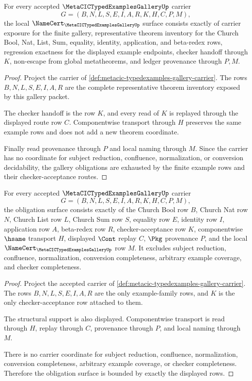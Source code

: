 \begin{theorem}
\label{thm:metacic-typedexamples-gallery-namecert-obligations}
For every accepted $\MetaCICTypedExamplesGalleryUp$ carrier
$$
G=(B,N,L,S,E,I,A,R,K,H,C,P,M),
$$
the local $\NameCert_{\MetaCICTypedExamplesGalleryUp}$ surface consists exactly of carrier exposure for the finite gallery, representative theorem inventory for the Church Bool, Nat, List, Sum, equality, identity, application, and beta-redex rows, regression exactness for the displayed example endpoints, checker handoff through $K$, non-escape from global metatheorems, and ledger provenance through $P,M$.
\end{theorem}
\begin{proof}
Project the carrier of \autoref{def:metacic-typedexamples-gallery-carrier}. The rows $B,N,L,S,E,I,A,R$ are the complete representative theorem inventory exposed by this gallery packet.

The checker handoff is the row $K$, and every read of $K$ is replayed through the displayed route row $C$. Componentwise transport through $H$ preserves the same example rows and does not add a new theorem coordinate.

Finally read provenance through $P$ and local naming through $M$. Since the carrier has no coordinate for subject reduction, confluence, normalization, or conversion decidability, the gallery obligations are exhausted by the finite example rows and their checker-acceptance routes.
\end{proof}

\begin{theorem}
\label{thm:metacic-typedexamples-gallery-obligation-surface}
For every accepted $\MetaCICTypedExamplesGalleryUp$ carrier
$$
G=(B,N,L,S,E,I,A,R,K,H,C,P,M),
$$
the obligation surface consists exactly of the Church Bool row $B$, Church Nat row $N$, Church List row $L$, Church Sum row $S$, equality row $E$, identity row $I$, application row $A$, beta-redex row $R$, checker-acceptance row $K$, componentwise $\hsame$ transport $H$, displayed $\Cont$ replay $C$, $\Pkg$ provenance $P$, and the local $\NameCert_{\MetaCICTypedExamplesGalleryUp}$ row $M$. It excludes subject reduction, confluence, normalization, conversion completeness, arbitrary example coverage, and checker completeness.
\end{theorem}
\begin{proof}
Project the accepted carrier of \autoref{def:metacic-typedexamples-gallery-carrier}. The rows $B,N,L,S,E,I,A,R$ are the only example-family rows, and $K$ is the only checker-acceptance row attached to them.

The structural support is also displayed. Componentwise transport is read through $H$, replay through $C$, provenance through $P$, and local naming through $M$.

There is no carrier coordinate for subject reduction, confluence, normalization, conversion completeness, arbitrary example coverage, or checker completeness. Therefore the obligation surface is bounded by exactly the displayed rows.
\end{proof}


